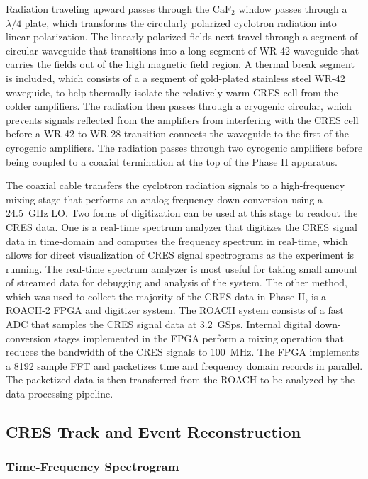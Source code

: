 Radiation traveling upward passes through the $\mathrm{CaF}_2$ window passes through a $\lambda/4$ plate, which transforms the circularly polarized cyclotron radiation into linear polarization. The linearly polarized fields next travel through a segment of circular waveguide that transitions into a long segment of WR-42 waveguide that carries the fields out of the high magnetic field region. A thermal break segment is included, which consists of a a segment of gold-plated stainless steel WR-42 waveguide, to help thermally isolate the relatively warm CRES cell from the colder amplifiers. The radiation then passes through a cryogenic circular, which prevents signals reflected from the amplifiers from interfering with the CRES cell before a WR-42 to WR-28 transition connects the waveguide to the first of the cyrogenic amplifiers. The radiation passes through two cyrogenic amplifiers before being coupled to a coaxial termination at the top of the Phase II apparatus.

The coaxial cable transfers the cyclotron radiation signals to a high-frequency mixing stage that performs an analog frequency down-conversion using a 24.5~GHz LO. Two forms of digitization can be used at this stage to readout the CRES data. One is a real-time spectrum analyzer that digitizes the CRES signal data in time-domain and computes the frequency spectrum in real-time, which allows for direct visualization of CRES signal spectrograms as the experiment is running. The real-time spectrum analyzer is most useful for taking small amount of streamed data for debugging and analysis of the system. The other method, which was used to collect the majority of the CRES data in Phase II, is a ROACH-2 FPGA and digitizer system. The ROACH system consists of a fast ADC that samples the CRES signal data at 3.2~GSps. Internal digital down-conversion stages implemented in the FPGA perform a mixing operation that reduces the bandwidth of the CRES signals to 100~MHz. The FPGA implements a 8192 sample FFT and packetizes time and frequency domain records in parallel. The packetized data is then transferred from the ROACH to be analyzed by the data-processing pipeline.

\subsection{CRES Track and Event Reconstruction}

\subsubsection*{Time-Frequency Spectrogram}

